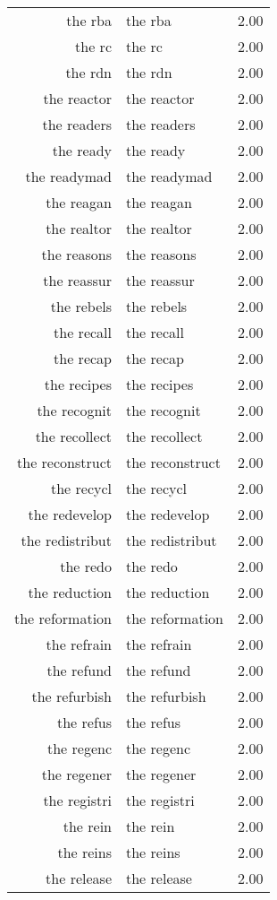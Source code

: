 \begin{table}[ht]
\begin{tabular}{rlr}
  the rba & the rba & 2.00 \\ 
  the rc & the rc & 2.00 \\ 
  the rdn & the rdn & 2.00 \\ 
  the reactor & the reactor & 2.00 \\ 
  the readers & the readers & 2.00 \\ 
  the ready & the ready & 2.00 \\ 
  the readymad & the readymad & 2.00 \\ 
  the reagan & the reagan & 2.00 \\ 
  the realtor & the realtor & 2.00 \\ 
  the reasons & the reasons & 2.00 \\ 
  the reassur & the reassur & 2.00 \\ 
  the rebels & the rebels & 2.00 \\ 
  the recall & the recall & 2.00 \\ 
  the recap & the recap & 2.00 \\ 
  the recipes & the recipes & 2.00 \\ 
  the recognit & the recognit & 2.00 \\ 
  the recollect & the recollect & 2.00 \\ 
  the reconstruct & the reconstruct & 2.00 \\ 
  the recycl & the recycl & 2.00 \\ 
  the redevelop & the redevelop & 2.00 \\ 
  the redistribut & the redistribut & 2.00 \\ 
  the redo & the redo & 2.00 \\ 
  the reduction & the reduction & 2.00 \\ 
  the reformation & the reformation & 2.00 \\ 
  the refrain & the refrain & 2.00 \\ 
  the refund & the refund & 2.00 \\ 
  the refurbish & the refurbish & 2.00 \\ 
  the refus & the refus & 2.00 \\ 
  the regenc & the regenc & 2.00 \\ 
  the regener & the regener & 2.00 \\ 
  the registri & the registri & 2.00 \\ 
  the rein & the rein & 2.00 \\ 
  the reins & the reins & 2.00 \\ 
  the release & the release & 2.00 \\ 

\end{tabular}
\end{table}
